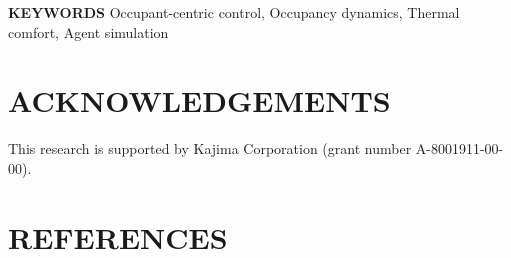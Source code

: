 \documentclass[12pt,a4paper]{article}
\begin{document}
\vspace{\baselineskip}
\noindent\textbf{KEYWORDS}
\noindent
Occupant-centric control, Occupancy dynamics, Thermal comfort, Agent simulation











\section*{ACKNOWLEDGEMENTS}

This research is supported by Kajima Corporation (grant number A-8001911-00-00).  

\section*{REFERENCES}

\printbibliography[heading=none]
\end{document}
